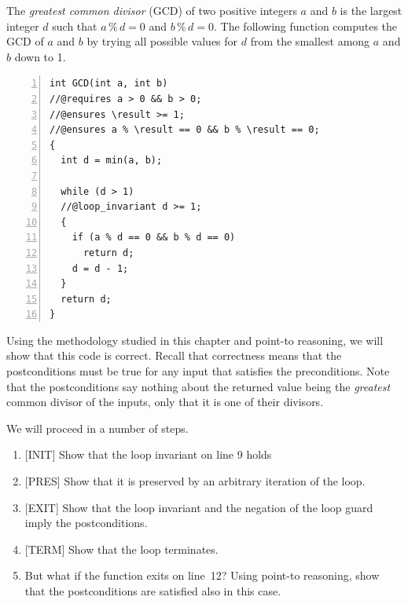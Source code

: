 \begin{flex}
\begin{exercise}[GCD]%
\label{ex:contracts:gcd}
  The \emph{greatest common divisor} (GCD) of two positive integers
  $a$ and $b$ is the largest integer $d$ such that $a \mathop{\%} d =
  0$ and $b \mathop{\%} d = 0$.  The following function computes the
  GCD of $a$ and $b$ by trying all possible values for $d$ from the
  smallest among $a$ and $b$ down to 1.

\begin{lstlisting}[language={[C0]C}, numbers=left]
int GCD(int a, int b)
//@requires a > 0 && b > 0;
//@ensures \result >= 1;
//@ensures a % \result == 0 && b % \result == 0;
{
  int d = min(a, b);

  while (d > 1)
  //@loop_invariant d >= 1;
  {
    if (a % d == 0 && b % d == 0)
      return d;
    d = d - 1;
  }
  return d;
}
\end{lstlisting}
Using the methodology studied in this chapter and point-to reasoning,
we will show that this code is correct.  Recall that correctness means
that the postconditions must be true for any input that satisfies the
preconditions.  Note that the postconditions say nothing about the
returned value being the \emph{greatest} common divisor of the inputs,
only that it is one of their divisors.

We will proceed in a number of steps.
\begin{enumerate}[label=\alph*]
\item {[INIT]} %
  Show that the loop invariant on line 9 holds
\item {[PRES]} %
  Show that it is preserved by an arbitrary iteration of the loop.
\item {[EXIT]} %
  Show that the loop invariant and the negation of
  the loop guard imply the postconditions.
\item {[TERM]} %
  Show that the loop terminates.
\item%
  But what if the function exits on line~12?
  Using point-to reasoning, show that the postconditions are satisfied
  also in this case.
\end{enumerate}
\end{exercise}

\begin{solution}
\label{ex:contracts:gcd-solved}


\end{solution}
\end{flex}
